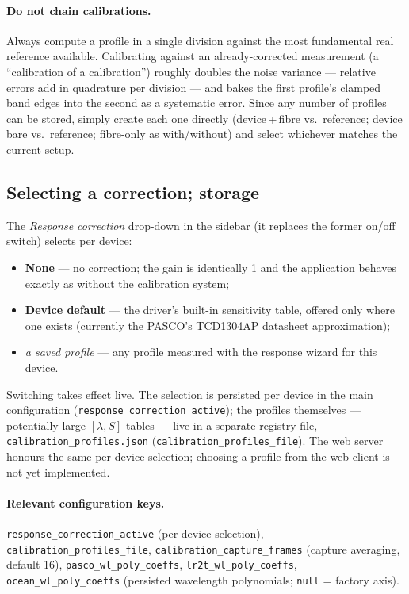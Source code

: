 \paragraph{Do not chain calibrations.}
Always compute a profile in a single division against the most fundamental
real reference available. Calibrating against an already-corrected measurement
(a ``calibration of a calibration'') roughly doubles the noise variance ---
relative errors add in quadrature per division --- and bakes the first
profile's clamped band edges into the second as a systematic error. Since any
number of profiles can be stored, simply create each one directly
(device\,+\,fibre vs.\ reference; device bare vs.\ reference; fibre-only as
with/without) and select whichever matches the current setup.

\subsection{Selecting a correction; storage}
\label{sec:cal-storage}

The \emph{Response correction} drop-down in the sidebar (it replaces the
former on/off switch) selects per device:

\begin{itemize}
  \item \textbf{None} --- no correction; the gain is identically 1 and the
        application behaves exactly as without the calibration system;
  \item \textbf{Device default} --- the driver's built-in sensitivity table,
        offered only where one exists (currently the PASCO's TCD1304AP
        datasheet approximation);
  \item \emph{a saved profile} --- any profile measured with the response
        wizard for this device.
\end{itemize}

Switching takes effect live. The selection is persisted per device in the
main configuration (\texttt{response\_correction\_active}); the profiles
themselves --- potentially large $[\lambda, S]$ tables --- live in a separate
registry file, \texttt{calibration\_profiles.json}
(\texttt{calibration\_profiles\_file}). The web server honours the same
per-device selection; choosing a profile from the web client is not yet
implemented.

\paragraph{Relevant configuration keys.}
\texttt{response\_correction\_active} (per-device selection),
\texttt{calibration\_profiles\_file},
\texttt{calibration\_capture\_frames} (capture averaging, default 16),
\texttt{pasco\_wl\_poly\_coeffs}, \texttt{lr2t\_wl\_poly\_coeffs},
\texttt{ocean\_wl\_poly\_coeffs} (persisted wavelength polynomials;
\texttt{null} = factory axis).
